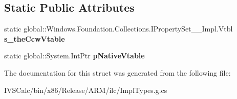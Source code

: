 \subsection*{Static Public Attributes}
\begin{DoxyCompactItemize}
\item 
\mbox{\label{struct_windows_1_1_foundation_1_1_collections_1_1_i_property_set_____impl_1_1_vtbl_adae38caaaa2f69c94f1215373821d091}} 
static global\+::\+Windows.\+Foundation.\+Collections.\+I\+Property\+Set\+\_\+\+\_\+\+Impl.\+Vtbl {\bfseries s\+\_\+the\+Ccw\+Vtable}
\item 
\mbox{\label{struct_windows_1_1_foundation_1_1_collections_1_1_i_property_set_____impl_1_1_vtbl_a2016224baa53932e2f529da2226eb30b}} 
static global\+::\+System.\+Int\+Ptr {\bfseries p\+Native\+Vtable}
\end{DoxyCompactItemize}


The documentation for this struct was generated from the following file\+:\begin{DoxyCompactItemize}
\item 
I\+V\+S\+Calc/bin/x86/\+Release/\+A\+R\+M/ilc/Impl\+Types.\+g.\+cs\end{DoxyCompactItemize}
